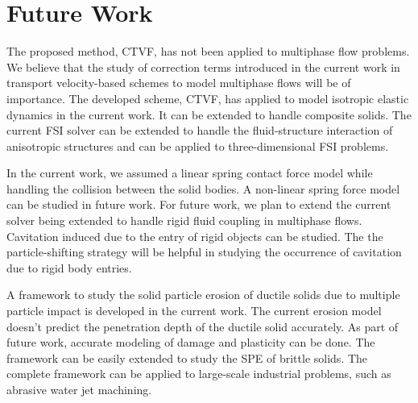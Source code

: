 \section{Future Work}\label{conclusions:future_work}
The proposed method, CTVF, has not been applied to multiphase flow problems. We
believe that the study of correction terms introduced in the current work in
transport velocity-based schemes to model multiphase flows will be of
importance. The developed scheme, CTVF, has applied to model isotropic elastic
dynamics in the current work. It can be extended to handle composite solids. The
current FSI solver can be extended to handle the fluid-structure interaction of
anisotropic structures and can be applied to three-dimensional FSI problems.


In the current work, we assumed a linear spring contact force model while
handling the collision between the solid bodies. A non-linear spring force model
can be studied in future work. For future work, we plan to extend the current
solver being extended to handle rigid fluid coupling in multiphase flows.
Cavitation induced due to the entry of rigid objects can be studied. The
the particle-shifting strategy will be helpful in studying the occurrence of
cavitation due to rigid body entries.


A framework to study the solid particle erosion of ductile solids due to
multiple particle impact is developed in the current work. The current erosion
model doesn't predict the penetration depth of the ductile solid accurately. As
part of future work, accurate modeling of damage and plasticity can be done. The
framework can be easily extended to study the SPE of brittle solids. The
complete framework can be applied to large-scale industrial problems, such as
abrasive water jet machining.
